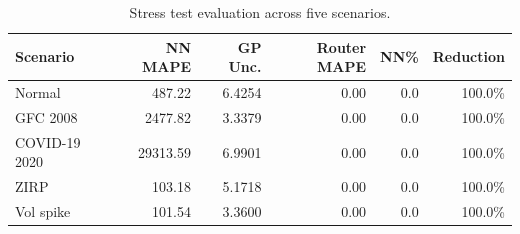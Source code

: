 \begin{table}[h]
\centering
\caption{Stress test evaluation across five scenarios.}
\begin{tabular}{lrrrrr}
\hline
Scenario & NN MAPE & GP Unc. & Router MAPE & NN\% & Reduction \\
\hline
Normal & 487.22 & 6.4254 & 0.00 & 0.0 & 100.0\% \\
GFC 2008 & 2477.82 & 3.3379 & 0.00 & 0.0 & 100.0\% \\
COVID-19 2020 & 29313.59 & 6.9901 & 0.00 & 0.0 & 100.0\% \\
ZIRP & 103.18 & 5.1718 & 0.00 & 0.0 & 100.0\% \\
Vol spike & 101.54 & 3.3600 & 0.00 & 0.0 & 100.0\% \\
\hline
\end{tabular}
\end{table}